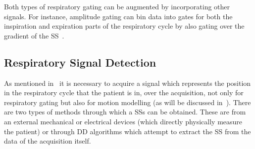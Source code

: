             Both types of respiratory gating can be augmented by incorporating other signals. For instance, amplitude gating can bin data into gates for both the inspiration and expiration parts of the respiratory cycle by also gating over the gradient of the \gls{SS}~\parencite{Low2005}.
        
        \subsection{Respiratory Signal Detection} \label{sec:respiratory_signal_detection}
            As mentioned in~ it is necessary to acquire a signal which represents the position in the respiratory cycle that the patient is in, over the acquisition, not only for respiratory gating but also for motion modelling (as will be discussed in~). There are two types of methods through which a \glspl{SS} can be obtained. These are from an external mechanical or electrical devices (which directly physically measure the patient) or through \gls{DD} algorithms which attempt to extract the \gls{SS} from the data of the acquisition itself.
            
